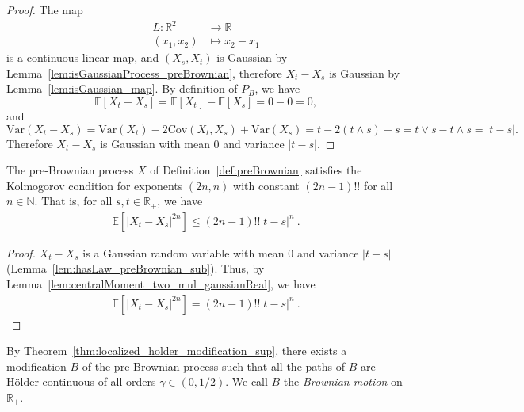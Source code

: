\begin{proof}\leanok
The map
\begin{align*}
  L : \mathbb{R}^2 &\to \mathbb{R} \\
  (x_1, x_2) &\mapsto x_2 - x_1
\end{align*}
is a continuous linear map, and $(X_s, X_t)$ is Gaussian by Lemma~\ref{lem:isGaussianProcess_preBrownian}, therefore $X_t - X_s$ is Gaussian by Lemma~\ref{lem:isGaussian_map}. By definition of $P_B$, we have
$$\mathbb{E}[X_t - X_s] = \mathbb{E}[X_t] - \mathbb{E}[X_s] = 0 - 0 = 0,$$
and
$$\mathrm{Var}(X_t - X_s) = \mathrm{Var}(X_t) - 2\mathrm{Cov}(X_t, X_s) + \mathrm{Var}(X_s) = t - 2(t \land s) + s = t \lor s - t \land s = |t - s|.$$
Therefore $X_t - X_s$ is Gaussian with mean $0$ and variance $|t - s|$.
\end{proof}


\begin{lemma}\label{lem:isKolmogorovProcess_preBrownian}
  \leanok
The pre-Brownian process $X$ of Definition~\ref{def:preBrownian} satisfies the Kolmogorov condition for exponents $(2n,n)$ with constant $(2n - 1)!!$ for all $n \in \mathbb{N}$.
That is, for all $s, t \in \mathbb{R}_+$, we have
\begin{align*}
  \mathbb{E} \left[ |X_t - X_s|^{2n} \right] \le (2n - 1)!! |t - s|^n
  \: .
\end{align*}
\end{lemma}

\begin{proof}\leanok
$X_t - X_s$ is a Gaussian random variable with mean $0$ and variance $|t - s|$ (Lemma~\ref{lem:hasLaw_preBrownian_sub}).
Thus, by Lemma~\ref{lem:centralMoment_two_mul_gaussianReal}, we have
\begin{align*}
  \mathbb{E} \left[ |X_t - X_s|^{2n} \right]
  = (2n - 1)!! |t - s|^n
  \: .
\end{align*}
\end{proof}


\begin{definition}\label{def:brownian}
  \leanok
By Theorem~\ref{thm:localized_holder_modification_sup}, there exists a modification $B$ of the pre-Brownian process such that all the paths of $B$ are Hölder continuous of all orders $\gamma \in (0, 1/2)$.
We call $B$ the \emph{Brownian motion} on $\mathbb{R}_+$.
\end{definition}


